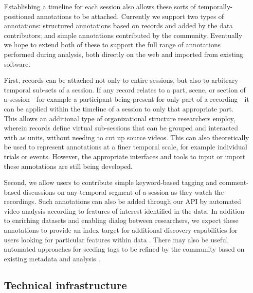 \documentclass{sig-alternate}
\begin{document}
Establishing a timeline for each session also allows these sorts of temporally-positioned annotations to be attached.
Currently we support two types of annotations: structured annotations based on records and added by the data contributors; and simple annotations contributed by the community.
Eventually we hope to extend both of these to support the full range of annotations performed during analysis, both directly on the web and imported from existing software.

First, records can be attached not only to entire sessions, but also to arbitrary temporal sub-sets of a session.
If any record relates to a part, scene, or section of a session---for example a participant being present for only part of a recording---it can be applied within the timeline of a session to only that appropriate part.
This allows an additional type of organizational structure researchers employ, wherein records define virtual sub-sessions that can be grouped and interacted with as units, without needing to cut up source videos.
This can also theoretically be used to represent annotations at a finer temporal scale, for example individual trials or events.
However, the appropriate interfaces and tools to input or import these annotations are still being developed.

Second, we allow users to contribute simple keyword-based tagging and comment-based discussions on any temporal segment of a session as they watch the recordings.
Such annotations can also be added through our API by automated video analysis according to features of interest identified in the data.
In addition to enriching datasets and enabling dialog between researchers, we expect these annotations to provide an index target for additional discovery capabilities for users looking for particular features within data \cite{Lanagan_Smeaton_2012}.
There may also be useful automated approaches for seeding tags to be refined by the community based on existing metadata and analysis \cite{Yang_Lu_Giles_2011,Farooq_etal_2007,Giles2013}.

\subsection{Technical infrastructure}
\end{document}
